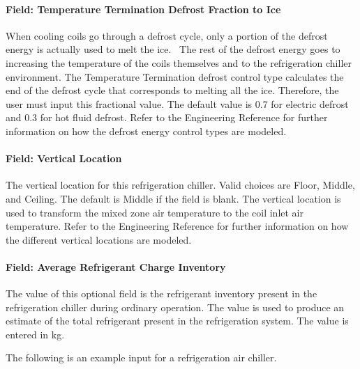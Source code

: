 \paragraph{Field: Temperature Termination Defrost Fraction to Ice}\label{field-temperature-termination-defrost-fraction-to-ice-1}

When cooling coils go through a defrost cycle, only a portion of the defrost energy is actually used to melt the ice.~ The rest of the defrost energy goes to increasing the temperature of the coils themselves and to the refrigeration chiller environment. The Temperature Termination defrost control type calculates the end of the defrost cycle that corresponds to melting all the ice. Therefore, the user must input this fractional value. The default value is 0.7 for electric defrost and 0.3 for hot fluid defrost. Refer to the Engineering Reference for further information on how the defrost energy control types are modeled.

\paragraph{Field: Vertical Location}\label{field-vertical-location}

The vertical location for this refrigeration chiller. Valid choices are Floor, Middle, and Ceiling. The default is Middle if the field is blank. The vertical location is used to transform the mixed zone air temperature to the coil inlet air temperature. Refer to the Engineering Reference for further information on how the different vertical locations are modeled.

\paragraph{Field: Average Refrigerant Charge Inventory}\label{field-average-refrigerant-charge-inventory-2}

The value of this optional field is the refrigerant inventory present in the refrigeration chiller during ordinary operation. The value is used to produce an estimate of the total refrigerant present in the refrigeration system. The value is entered in kg.

The following is an example input for a refrigeration air chiller.

